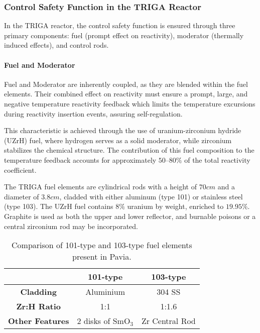 \subsubsection{Control Safety Function in the TRIGA Reactor}

In the TRIGA reactor, the control safety function is ensured through three primary components: fuel (prompt effect on reactivity), moderator (thermally induced effects), and control rods.

\paragraph{Fuel and Moderator} Fuel and Moderator are inherently coupled, as they are blended within the fuel elements. Their combined effect on reactivity must ensure a prompt, large, and negative temperature reactivity feedback which limits the temperature excursions during reactivity insertion events, assuring self-regulation.

This characteristic is achieved through the use of uranium-zirconium hydride (UZrH) fuel, where hydrogen serves as a solid moderator, while zirconium stabilizes the chemical structure. The contribution of this fuel composition to the temperature feedback accounts for approximately $50–80\%$ of the total reactivity coefficient.

The TRIGA fuel elements are cylindrical rods with a height of $70 cm$ and a diameter of $3.8 cm$, cladded with either aluminum (type 101) or stainless steel (type 103). The UZrH fuel contains $8\%$ uranium by weight, enriched to $19.95\%$. Graphite is used as both the upper and lower reflector, and burnable poisons or a central zirconium rod may be incorporated.

\begin{table}[H]
    \centering
    \renewcommand{\arraystretch}{1.5} %
    \setlength{\tabcolsep}{10pt} %
    \begin{tabular}{|c|c|c|}
        \hline
        \textbf{} & \textbf{101-type} & \textbf{103-type} \\
        \hline
        \textbf{Cladding} & {Aluminium} & {304 SS} \\
        \hline
        \textbf{Zr:H Ratio} & {1:1} & {1:1.6} \\
        \hline
        \textbf{Other Features} & {2 disks of SmO$_3$} & {Zr Central Rod} \\
        \hline
    \end{tabular}
    \caption{Comparison of 101-type and 103-type fuel elements present in Pavia.}
    \label{tab:fuel_types}
\end{table}

